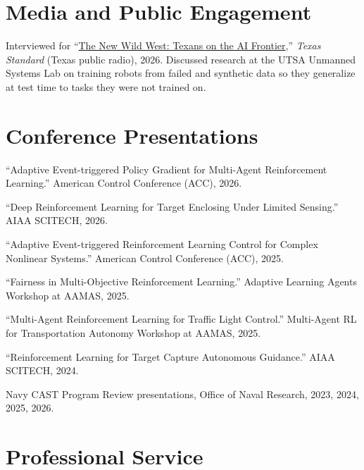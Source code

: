 \documentclass[letterpaper,11pt]{article}
\begin{document}
\section*{Media and Public Engagement}
\begin{cvlist}
    \item Interviewed for ``\href{https://specials.texasstandard.org/texas-ai-accessibility-threats/}{The New Wild West: Texans on the AI Frontier},'' \textit{Texas Standard} (Texas public radio), 2026. Discussed research at the UTSA Unmanned Systems Lab on training robots from failed and synthetic data so they generalize at test time to tasks they were not trained on.
\end{cvlist}

\section*{Conference Presentations}
\begin{publist}[label={[T\arabic*]}]
    \item ``Adaptive Event-triggered Policy Gradient for Multi-Agent Reinforcement Learning.'' American Control Conference (ACC), 2026.
    \item ``Deep Reinforcement Learning for Target Enclosing Under Limited Sensing.'' AIAA SCITECH, 2026.
    \item ``Adaptive Event-triggered Reinforcement Learning Control for Complex Nonlinear Systems.'' American Control Conference (ACC), 2025.
    \item ``Fairness in Multi-Objective Reinforcement Learning.'' Adaptive Learning Agents Workshop at AAMAS, 2025.
    \item ``Multi-Agent Reinforcement Learning for Traffic Light Control.'' Multi-Agent RL for Transportation Autonomy Workshop at AAMAS, 2025.
    \item ``Reinforcement Learning for Target Capture Autonomous Guidance.'' AIAA SCITECH, 2024.
    \item Navy CAST Program Review presentations, Office of Naval Research, 2023, 2024, 2025, 2026.
\end{publist}

\section*{Professional Service}
\end{document}
